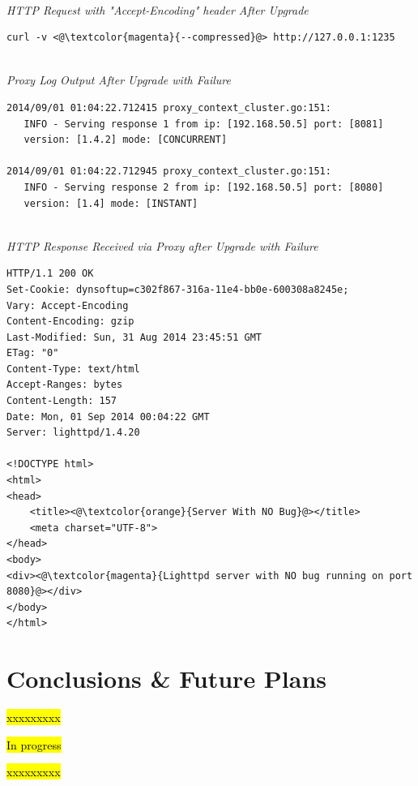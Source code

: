 \documentclass[a4paper,11pt,twoside]{report}
\begin{document}
\noindent \\
\textit{HTTP Request with "Accept-Encoding" header After Upgrade} 
\begin{lstlisting}[language=terminal]
curl -v <@\textcolor{magenta}{--compressed}@> http://127.0.0.1:1235 
\end{lstlisting}  

\noindent \\
\textit{Proxy Log Output After Upgrade with Failure}
\begin{lstlisting}[language=terminal]
2014/09/01 01:04:22.712415 proxy_context_cluster.go:151:     
   INFO - Serving response 1 from ip: [192.168.50.5] port: [8081] 
   version: [1.4.2] mode: [CONCURRENT]
   
2014/09/01 01:04:22.712945 proxy_context_cluster.go:151:     
   INFO - Serving response 2 from ip: [192.168.50.5] port: [8080] 
   version: [1.4] mode: [INSTANT]
\end{lstlisting} 

\noindent\\
\textit{HTTP Response Received via Proxy after Upgrade with Failure}  
\begin{lstlisting}[language=terminal]
HTTP/1.1 200 OK
Set-Cookie: dynsoftup=c302f867-316a-11e4-bb0e-600308a8245e;
Vary: Accept-Encoding
Content-Encoding: gzip
Last-Modified: Sun, 31 Aug 2014 23:45:51 GMT
ETag: "0"
Content-Type: text/html
Accept-Ranges: bytes
Content-Length: 157
Date: Mon, 01 Sep 2014 00:04:22 GMT
Server: lighttpd/1.4.20
 
<!DOCTYPE html>
<html>
<head>
    <title><@\textcolor{orange}{Server With NO Bug}@></title>
    <meta charset="UTF-8">
</head>
<body>
<div><@\textcolor{magenta}{Lighttpd server with NO bug running on port 8080}@></div>
</body>
</html>
\end{lstlisting} 




\clearpage



\chapter{Conclusions \& Future Plans}
\hl{xxxxxxxxx}\bigskip

\noindent
\hl{In progress}\bigskip

\noindent
\hl{xxxxxxxxx}\bigskip


\clearpage
\end{document}

